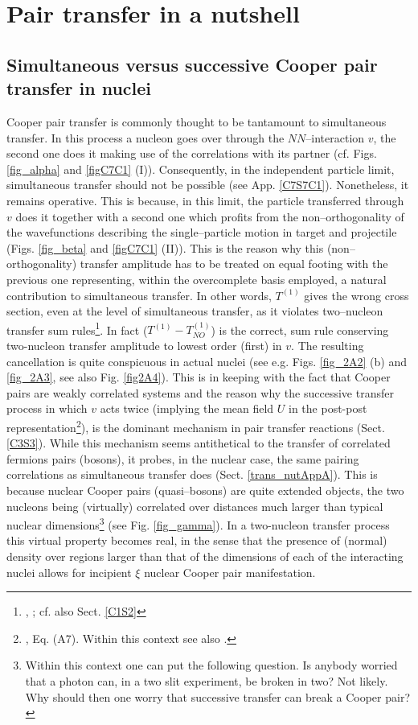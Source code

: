 \chapter[Simultaneous versus successive transfer]{Pair transfer in a nutshell}\label{chapter2}
\section{Simultaneous versus successive Cooper pair transfer in nuclei}\label{C2S1}
Cooper pair transfer is commonly thought to be tantamount to simultaneous transfer. In this process a nucleon goes over through the $NN$--interaction $v$, the second one does it making use of the correlations with its partner (cf. Figs. \ref{fig_alpha} and \ref{figC7C1} (I)). Consequently, in the independent particle limit, simultaneous  transfer should not be possible (see App. \ref{C7S7C1}). Nonetheless, it remains operative. This is because, in this limit, the particle transferred through $v$ does it together with a second one which profits from the non--orthogonality of the wavefunctions describing the single--particle motion in target and projectile (Figs. \ref{fig_beta} and \ref{figC7C1} (II)). This is the reason why this (non--orthogonality) transfer amplitude has to be treated on equal footing with  the previous one  representing, within the overcomplete basis employed, a natural contribution to simultaneous transfer. In other words, $T^{(1)}$ gives the wrong cross section, even at the level of simultaneous transfer, as it violates two--nucleon transfer sum rules\footnote{\cite{Broglia:72b}, \cite{Bayman:72}; cf. also Sect. \ref{C1S2}}. In fact ($T^{(1)}-T^{(1)}_{NO}$) is the correct, sum rule conserving two-nucleon transfer amplitude to lowest order (first) in $v$. The resulting cancellation is quite conspicuous in actual nuclei  (see e.g. Figs. \ref{fig_2A2} (b) and \ref{fig_2A3}, see also Fig. \ref{fig2A4}). This is in keeping with the fact that Cooper pairs are weakly correlated systems and the reason why the successive transfer process in which $v$ acts twice (implying the mean field $U$ in the post-post representation\footnote{\cite{Potel:13}, Eq. (A7). Within this context see also \cite{Pinkston:82}.}), is the dominant mechanism in pair transfer reactions (Sect. \ref{C3S3}). While this mechanism seems antithetical to the transfer of  correlated fermions pairs (bosons), it probes, in the nuclear case, the same pairing correlations as simultaneous transfer does (Sect. \ref{trans_nutAppA}). This is because nuclear Cooper pairs (quasi--bosons) are quite extended objects, the two nucleons being (virtually) correlated over distances much larger than typical nuclear dimensions\footnote{Within this context one can put the following question. Is anybody worried that a photon can, in a two slit experiment, be broken in two? Not likely. Why should then one worry that successive transfer can break a Cooper pair?} (see Fig. \ref{fig_gamma}). In a two-nucleon transfer process this virtual property becomes real, in the sense that the presence of (normal) density over regions larger than that of the dimensions of each of the interacting nuclei allows for incipient $\xi$ nuclear Cooper pair manifestation.



